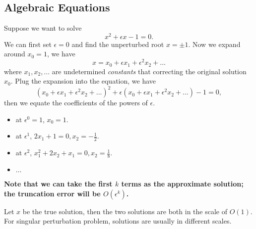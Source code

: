 \begin{refsection}
\subsection{Algebraic Equations}
\begin{example}
Suppose we want to solve 
$$x^2 + \epsilon x - 1 = 0.$$
We can first set $\epsilon = 0$ and find the unperturbed root $x = \pm 1$. Now we expand around $x_0 = 1$, we have
$$x = x_0 + \epsilon x_1 + \epsilon^2 x_2 + ...$$
where $x_1,x_2,...$ are undetermined \emph{constants} that correcting the original solution $x_0$.  Plug the expansion into the equation, we have
$$(x_0 + \epsilon x_1 + \epsilon^2 x_2 + ...)^2 + \epsilon(x_0 + \epsilon x_1 + \epsilon^2 x_2 + ...) - 1 = 0,$$
then we equate the coefficients of the powers of $\epsilon$. 
\begin{itemize}
	\item at $\epsilon^0 = 1$, $x_0 = 1$.
	\item at $\epsilon^1$, $2x_1 + 1= 0, x_2 = -\frac{1}{2}$.
	\item at $\epsilon^2$, $x_1^2 + 2x_2 + x_1 = 0, x_2 = \frac{1}{8}$.
	\item $\dots$
\end{itemize}
\textbf{Note that we can take the first $k$ terms as the approximate solution; the truncation error will be $O(\epsilon^k)$.} 
\end{example}

\begin{remark}
Let $x$ be the true solution, then the two solutions are both in the scale of $O(1)$. For singular perturbation problem, solutions are usually in different scales. 
\end{remark}




\end{refsection}
